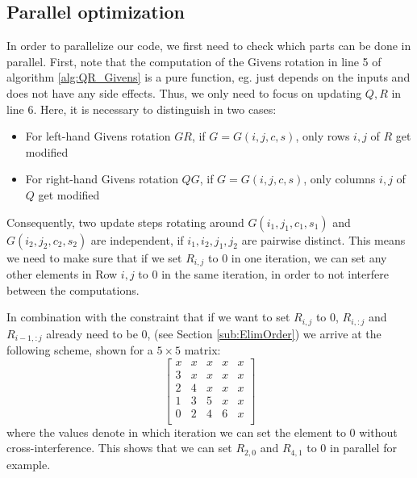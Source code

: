 \documentclass[a4paper]{scrartcl}
\begin{document}
            
    \subsection{Parallel optimization}\label{sec:Parallel}
        In order to parallelize our code, we first need to check which
        parts can be done in parallel. First, note that the computation
        of the Givens rotation in line 5 of algorithm
        \ref{alg:QR_Givens} is a pure function, eg. just depends on the
        inputs and does not have any side effects. Thus, we only need to
        focus on updating $Q,R$ in line 6. Here, it is necessary to
        distinguish in two cases:
        \begin{itemize}
            \item For left-hand Givens rotation $GR$, if $G=G(i,j,c,s)$,
            only rows $i,j$ of $R$ get modified
            \item For right-hand Givens rotation $QG$, if
            $G=G(i,j,c,s)$, only columns $i,j$ of $Q$ get modified
        \end{itemize}
        Consequently, two update steps rotating around
        $G(i_1,j_1,c_1,s_1)$ and $G(i_2,j_2,c_2,s_2)$ are independent,
        if $i_1, i_2, j_1, j_2$ are pairwise distinct. This means we
        need to make sure that if we set $R_{i,j}$ to 0 in one
        iteration, we can set any other elements in Row $i,j$ to 0 in
        the same iteration, in order to not interfere between the
        computations.
        
        
        In combination with the constraint that if we want to set
        $R_{i,j}$ to 0, $R_{i, :j}$ and $R_{i-1, :j}$ already need to be
        0, (see Section \ref{sub:ElimOrder}) we arrive at the following
        scheme, shown for a $5\times 5$ matrix:
        \begin{equation}\label{eq:It_Scheme_Parallel}
            \begin{bmatrix}
                x & x & x & x & x \\
                3 & x & x & x & x \\
                2 & 4 & x & x & x \\
                1 & 3 & 5 & x & x \\
                0 & 2 & 4 & 6 & x \\
            \end{bmatrix}
        \end{equation}
        where the values denote in which iteration we can set the element to 0
        without cross-interference. This shows that we can set $R_{2,0}$ and
        $R_{4,1}$ to 0 in parallel for example. 
        
\end{document}
